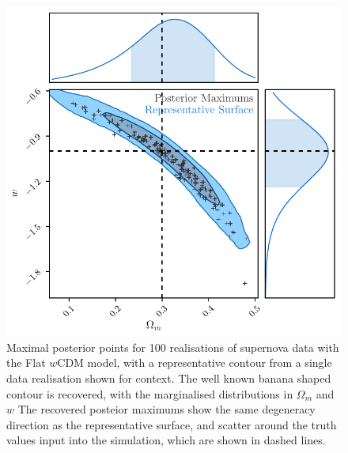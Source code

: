 \documentclass[twocolumn,trackchanges,tighten]{aastex62}
\begin{document}
\begin{figure}
	\begin{center}
		\includegraphics[width=\columnwidth]{simpleApproximateModelW.pdf}
	\end{center}
	\caption{Maximal posterior points for 100 realisations of supernova data with the Flat $w$CDM model, with a representative contour from a single data realisation shown for context. The well known banana shaped contour is recovered, with the marginalised distributions in $\Omega_m$ and $w$  The recovered posteior maximums show the same degeneracy direction as the representative surface, and scatter around the truth values input into the simulation, which are shown in dashed lines.}
	\label{fig:simple_w}
\end{figure}
\end{document}
